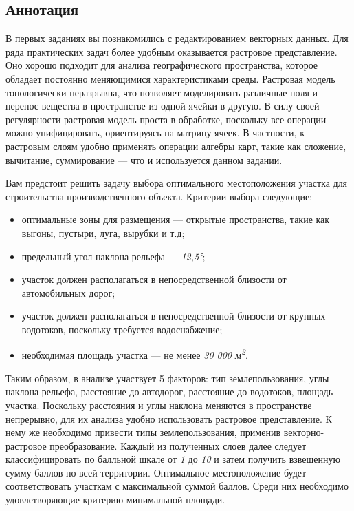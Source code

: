 \documentclass[12pt,]{book}
\begin{document}
\hypertarget{weighted-overlay-annotation}{%
\subsection{Аннотация}\label{weighted-overlay-annotation}}

В первых заданиях вы познакомились с редактированием векторных данных. Для ряда практических задач более удобным оказывается растровое представление. Оно хорошо подходит для анализа географического пространства, которое обладает постоянно меняющимися характеристиками среды. Растровая модель топологически неразрывна, что позволяет моделировать различные поля и перенос вещества в пространстве из одной ячейки в другую. В силу своей регулярности растровая модель проста в обработке, поскольку все операции можно унифицировать, ориентируясь на матрицу ячеек. В частности, к растровым слоям удобно применять операции алгебры карт, такие как сложение, вычитание, суммирование --- что и используется данном задании.

Вам предстоит решить задачу выбора оптимального местоположения участка для строительства производственного объекта. Критерии выбора следующие:

\begin{itemize}
\item
  оптимальные зоны для размещения --- открытые пространства, такие как выгоны, пустыри, луга, вырубки и т.д;
\item
  предельный угол наклона рельефа --- \emph{12,5°};
\item
  участок должен располагаться в непосредственной близости от автомобильных дорог;
\item
  участок должен располагаться в непосредственной близости от крупных водотоков, поскольку требуется водоснабжение;
\item
  необходимая площадь участка --- не менее \emph{30 000 м\textsuperscript{2}}.
\end{itemize}

Таким образом, в анализе участвует 5 факторов: тип землепользования, углы наклона рельефа, расстояние до автодорог, расстояние до водотоков, площадь участка. Поскольку расстояния и углы наклона меняются в пространстве непрерывно, для их анализа удобно использовать растровое представление. К нему же необходимо привести типы землепользования, применив векторно-растровое преобразование. Каждый из полученных слоев далее следует классифицировать по балльной шкале от \emph{1} до \emph{10} и затем получить взвешенную сумму баллов по всей территории. Оптимальное местоположение будет соответствовать участкам с максимальной суммой баллов. Среди них необходимо удовлетворяющие критерию минимальной площади.
\end{document}
